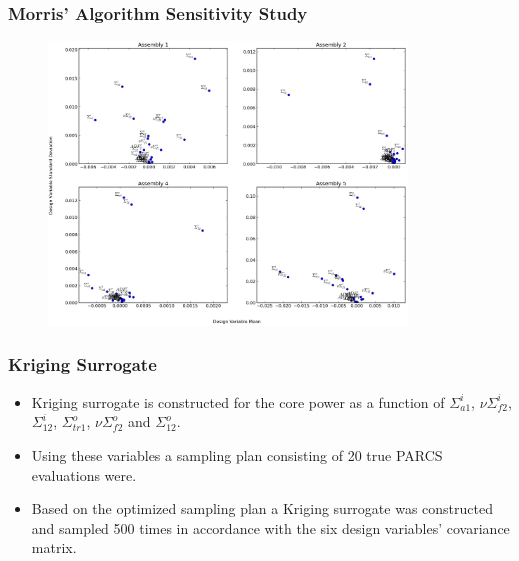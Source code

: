 \documentclass{beamer}
\begin{document}
\begin{frame}
\frametitle{Morris' Algorithm Sensitivity Study}

\begin{figure}
  \includegraphics[width=0.85\textwidth]{./tmi_important_vars.png}
\end{figure} 

\end{frame}
\begin{frame}
\frametitle{Kriging Surrogate}

\begin{itemize}
  \item Kriging surrogate is constructed for the core power as a function of $\Sigma_{a1}^i$, $\nu\Sigma_{f2}^i$, $\Sigma_{12}^i$, $\Sigma_{tr1}^o$, $\nu\Sigma_{f2}^o$ and $\Sigma_{12}^o$. 
  \item Using these variables a sampling plan consisting of 20 true PARCS evaluations were.
  \item Based on the optimized sampling plan a Kriging surrogate was constructed and sampled 500 times in accordance with the six design variables' covariance matrix.
\end{itemize}

\end{frame}
\end{document}
